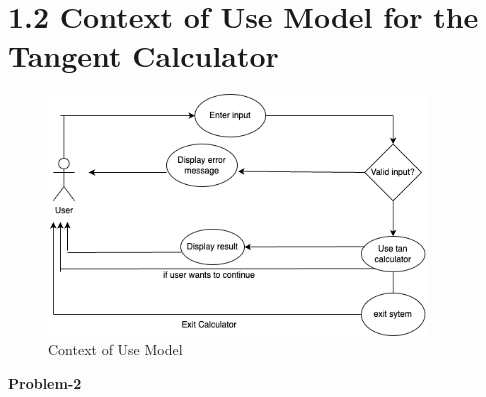 \documentclass[12pt]{article}
\begin{document}
\section*{1.2 Context of Use Model for the Tangent Calculator}
\begin{figure}[h!]
\centering
            \includegraphics[width=10cm]{context.png}
                \caption{Context of Use Model}
        \end{figure}
    
\newpage
\noindent
\Large\textbf{Problem-2}
\end{document}
